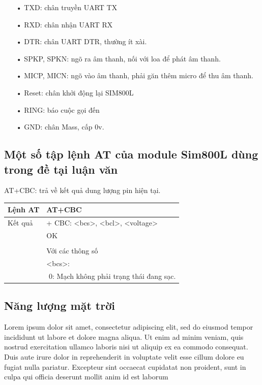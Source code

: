 \begin{itemize}
\item[•]TXD: chân truyền UART TX
\item[•]RXD: chân nhận UART RX
\item[•]DTR: chân UART DTR, thường ít xài.
\item[•]SPKP, SPKN: ngõ ra âm thanh, nối với loa để phát âm thanh.
\item[•]MICP, MICN: ngõ vào âm thanh, phải găn thêm micro để thu âm thanh.
\item[•]Reset: chân khởi động lại SIM800L
\item[•]RING: báo cuộc gọi đến
\item[•]GND: chân Mass, cấp 0v.
\end{itemize}
\subsection*{Một số tập lệnh AT của module Sim800L dùng trong đề tại luận văn}

AT+CBC: trả về kết quả dung lượng pin hiện tại.
\begin{table}[htp]
\label{my-label}
\begin{tabular}{|l|l|}
\hline
Lệnh AT & AT+CBC \\ \hline
Kết quả  & 
+ CBC: <bcs>, <bcl>, <voltage> \\
&OK \\
& \\
& Với các thông số \\
& 		<bcs>: \\
& $           $ 0: Mạch không phải trạng thái đang sạc. 


  \\ \hline
\end{tabular}
\end{table}














\subsection{Năng lượng mặt trời}
Lorem ipsum dolor sit amet, consectetur adipiscing elit, sed do eiusmod tempor incididunt ut labore et dolore magna aliqua. Ut enim ad minim veniam, quis nostrud exercitation ullamco laboris nisi ut aliquip ex ea commodo consequat. Duis aute irure dolor in reprehenderit in voluptate velit esse cillum dolore eu fugiat nulla pariatur. Excepteur sint occaecat cupidatat non proident, sunt in culpa qui officia deserunt mollit anim id est laborum

